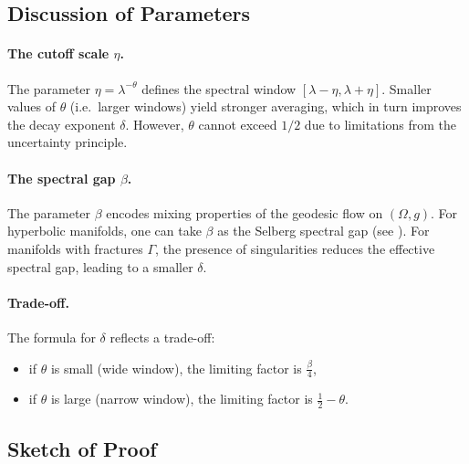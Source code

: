 \subsection{Discussion of Parameters}

\paragraph{The cutoff scale $\eta$.}
The parameter $\eta = \lambda^{-\theta}$ defines the spectral window
$[\lambda-\eta,\lambda+\eta]$. Smaller values of $\theta$ (i.e.\ larger
windows) yield stronger averaging, which in turn improves the decay exponent
$\delta$. However, $\theta$ cannot exceed $1/2$ due to limitations from the
uncertainty principle.

\paragraph{The spectral gap $\beta$.}
The parameter $\beta$ encodes mixing properties of the geodesic flow on
$(\Omega,g)$. For hyperbolic manifolds, one can take $\beta$ as the
Selberg spectral gap (see \cite{Sarnak1990, BourgainGamburd2007}).
For manifolds with fractures $\Gamma$, the presence of singularities
reduces the effective spectral gap, leading to a smaller $\delta$.

\paragraph{Trade-off.}
The formula for $\delta$ reflects a trade-off:
\begin{itemize}
  \item if $\theta$ is small (wide window), the limiting factor is
  $\tfrac{\beta}{4}$,
  \item if $\theta$ is large (narrow window), the limiting factor is
  $\tfrac{1}{2} - \theta$.
\end{itemize}

\subsection{Sketch of Proof}

